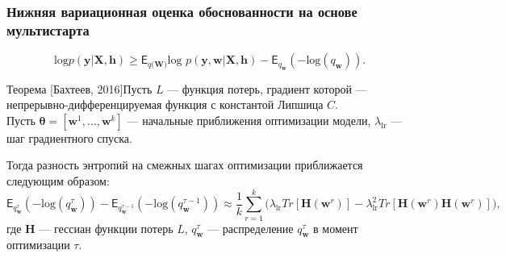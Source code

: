 \documentclass[usenames,dvipsnames,11pt,pdf,utf8,russian,aspectratio=43]{beamer}
\begin{document}
\begin{frame}
\small
\frametitle{Нижняя вариационная оценка обоснованности на основе мультистарта}
$$\text{log}p(\mathbf{y}|\mathbf{X}, \mathbf{h}) \geq \mathsf{E}_{q(\mathbf{W)}}\text{log~}p (\mathbf{y}, \mathbf{w}|\mathbf{X}, \mathbf{h}) - \mathsf{E}_{q_{\mathbf{w}}}(-\text{log}(q_\mathbf{w})).$$

\begin{block}{Теорема [Бахтеев, 2016]}Пусть $L$ --- функция потерь, градиент которой ---  непрерывно-дифференцируемая функция с константой Липшица $C$. \\
Пусть $\boldsymbol{\theta} = [\mathbf{w}^1,\dots,\mathbf{w}^k]$ ---  начальные приближения оптимизации модели, $\lambda_\text{lr}$ --- шаг градиентного спуска.

Тогда разность энтропий на смежных шагах оптимизации приближается следующим образом:
\small
\[
	\mathsf{E}_{q^{\tau}_{\mathbf{w}}}(-\text{log}(q^{\tau}_\mathbf{w})) -  \mathsf{E}_{q^{\tau-1}_{\mathbf{w}}}(-\text{log}(q^{\tau-1}_\mathbf{w}))  \approx  \frac{1}{k}\sum_{r=1}^k \bigl(\lambda_\text{lr} Tr[\mathbf{H}(\mathbf{w}^r)] - \lambda_\text{lr}^2 Tr[\mathbf{H}(\mathbf{w}^r)\mathbf{H}(\mathbf{w}^r)]  \bigr),
\]
где $\mathbf{H}$ --- гессиан функции потерь $L$, $q^{\tau}_\mathbf{w}$ --- распределение $q^{\tau}_\mathbf{w}$ в момент оптимизации $\tau$.
\end{block}
\end{frame}
\end{document}

